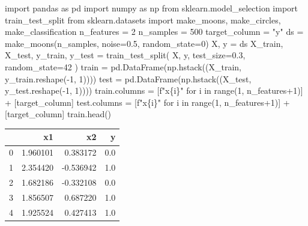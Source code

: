 \documentclass[
  letterpaper,
  DIV=11,
  numbers=noendperiod]{scrreprt}
\newenvironment{Shaded}{\begin{snugshade}}{\end{snugshade}}
\newcommand{\BuiltInTok}[1]{\textcolor[rgb]{0.00,0.23,0.31}{#1}}
\newcommand{\ControlFlowTok}[1]{\textcolor[rgb]{0.00,0.23,0.31}{#1}}
\newcommand{\DecValTok}[1]{\textcolor[rgb]{0.68,0.00,0.00}{#1}}
\newcommand{\FloatTok}[1]{\textcolor[rgb]{0.68,0.00,0.00}{#1}}
\newcommand{\ImportTok}[1]{\textcolor[rgb]{0.00,0.46,0.62}{#1}}
\newcommand{\KeywordTok}[1]{\textcolor[rgb]{0.00,0.23,0.31}{#1}}
\newcommand{\NormalTok}[1]{\textcolor[rgb]{0.00,0.23,0.31}{#1}}
\newcommand{\OperatorTok}[1]{\textcolor[rgb]{0.37,0.37,0.37}{#1}}
\newcommand{\SpecialCharTok}[1]{\textcolor[rgb]{0.37,0.37,0.37}{#1}}
\newcommand{\SpecialStringTok}[1]{\textcolor[rgb]{0.13,0.47,0.30}{#1}}
\newcommand{\StringTok}[1]{\textcolor[rgb]{0.13,0.47,0.30}{#1}}
\begin{document}
\begin{Shaded}
\begin{Highlighting}[]
\ImportTok{import}\NormalTok{ pandas }\ImportTok{as}\NormalTok{ pd}
\ImportTok{import}\NormalTok{ numpy }\ImportTok{as}\NormalTok{ np}
\ImportTok{from}\NormalTok{ sklearn.model\_selection }\ImportTok{import}\NormalTok{ train\_test\_split}
\ImportTok{from}\NormalTok{ sklearn.datasets }\ImportTok{import}\NormalTok{ make\_moons, make\_circles, make\_classification}
\NormalTok{n\_features }\OperatorTok{=} \DecValTok{2}
\NormalTok{n\_samples }\OperatorTok{=} \DecValTok{500}
\NormalTok{target\_column }\OperatorTok{=} \StringTok{"y"}
\NormalTok{ds }\OperatorTok{=}\NormalTok{  make\_moons(n\_samples, noise}\OperatorTok{=}\FloatTok{0.5}\NormalTok{, random\_state}\OperatorTok{=}\DecValTok{0}\NormalTok{)}
\NormalTok{X, y }\OperatorTok{=}\NormalTok{ ds}
\NormalTok{X\_train, X\_test, y\_train, y\_test }\OperatorTok{=}\NormalTok{ train\_test\_split(}
\NormalTok{    X, y, test\_size}\OperatorTok{=}\FloatTok{0.3}\NormalTok{, random\_state}\OperatorTok{=}\DecValTok{42}
\NormalTok{)}
\NormalTok{train }\OperatorTok{=}\NormalTok{ pd.DataFrame(np.hstack((X\_train, y\_train.reshape(}\OperatorTok{{-}}\DecValTok{1}\NormalTok{, }\DecValTok{1}\NormalTok{))))}
\NormalTok{test }\OperatorTok{=}\NormalTok{ pd.DataFrame(np.hstack((X\_test, y\_test.reshape(}\OperatorTok{{-}}\DecValTok{1}\NormalTok{, }\DecValTok{1}\NormalTok{))))}
\NormalTok{train.columns }\OperatorTok{=}\NormalTok{ [}\SpecialStringTok{f"x}\SpecialCharTok{\{}\NormalTok{i}\SpecialCharTok{\}}\SpecialStringTok{"} \ControlFlowTok{for}\NormalTok{ i }\KeywordTok{in} \BuiltInTok{range}\NormalTok{(}\DecValTok{1}\NormalTok{, n\_features}\OperatorTok{+}\DecValTok{1}\NormalTok{)] }\OperatorTok{+}\NormalTok{ [target\_column]}
\NormalTok{test.columns }\OperatorTok{=}\NormalTok{ [}\SpecialStringTok{f"x}\SpecialCharTok{\{}\NormalTok{i}\SpecialCharTok{\}}\SpecialStringTok{"} \ControlFlowTok{for}\NormalTok{ i }\KeywordTok{in} \BuiltInTok{range}\NormalTok{(}\DecValTok{1}\NormalTok{, n\_features}\OperatorTok{+}\DecValTok{1}\NormalTok{)] }\OperatorTok{+}\NormalTok{ [target\_column]}
\NormalTok{train.head()}
\end{Highlighting}
\end{Shaded}

\begin{tabular}{lrrr}
\toprule
{} &        x1 &        x2 &    y \\
\midrule
0 &  1.960101 &  0.383172 &  0.0 \\
1 &  2.354420 & -0.536942 &  1.0 \\
2 &  1.682186 & -0.332108 &  0.0 \\
3 &  1.856507 &  0.687220 &  1.0 \\
4 &  1.925524 &  0.427413 &  1.0 \\
\bottomrule
\end{tabular}
\end{document}
